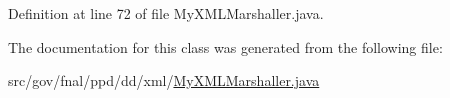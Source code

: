 Definition at line 72 of file My\-X\-M\-L\-Marshaller.\-java.



The documentation for this class was generated from the following file\-:\begin{DoxyCompactItemize}
\item 
src/gov/fnal/ppd/dd/xml/\hyperlink{MyXMLMarshaller_8java}{My\-X\-M\-L\-Marshaller.\-java}\end{DoxyCompactItemize}

